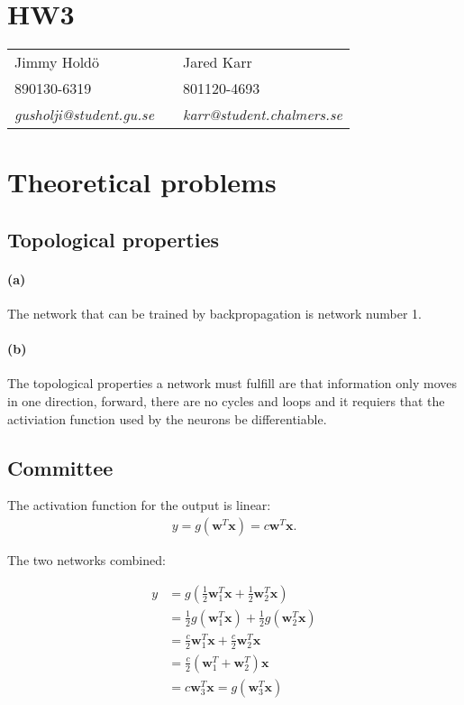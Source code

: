 \documentclass[a4paper,11pt]{article}
\begin{document}
	
	\section*{HW3}
	
	\begin{tabular*}{0.9\textwidth}{@{\extracolsep{\fill} } lll}
		Jimmy Hold\"{o} & & Jared Karr\\
		890130-6319 & & 801120-4693\\
		\it{gusholji@student.gu.se} & & \it{karr@student.chalmers.se}\\
	\end{tabular*}
	
	\section{Theoretical problems}
	\subsection{Topological properties}
	\paragraph{(a)}
	 The network that can be trained by backpropagation is network number 1.
	\paragraph{(b)}
	The topological properties a network must fulfill are that information only moves in one direction, forward, there are no cycles and loops and it requiers that the activiation function used by the neurons be differentiable.
	
	\subsection{Committee}
	The activation function for the output is linear:	
	\begin{align*}
		y = g(\bm{w}^T\bm{x}) = c \bm{w}^T \bm{x}.
	\end{align*}
	
	\noindent The two networks combined:
	
	\begin{align*}
	 y &=g(\frac{1}{2} \bm{w}_1^T \bm{x}+\frac{1}{2} \bm{w}_2^{T} \bm{x})\\
	 &= \frac{1}{2}g(\bm{w}_1^T \bm{x})+\frac{1}{2}g(\bm{w}_2^T \bm{x})\\ 
	 &=	\frac{c}{2}\bm{w}_1^T\bm{x}+\frac{c}{2}\bm{w}_2^T\bm{x} \\ 
	 &= \frac{c}{2}(\bm{w}_1^T+\bm{w}_2^T)\bm{x}\\ 
	 &= c \bm{w}_3^T \bm{x} = g(\bm{w}_3^T\bm{x})
	\end{align*}
	
\end{document}
